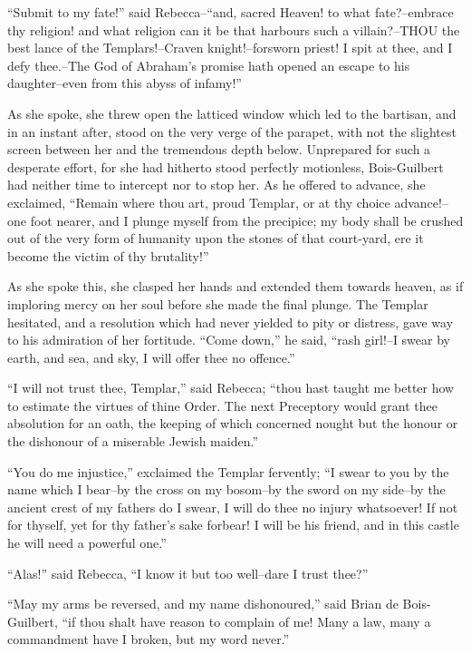 ``Submit to my fate!'' said Rebecca--``and, sacred Heaven! to what
fate?--embrace thy religion! and what religion can it be that harbours
such a villain?--THOU the best lance of the Templars!--Craven
knight!--forsworn priest! I spit at thee, and I defy thee.--The God of
Abraham's promise hath opened an escape to his daughter--even from this
abyss of infamy!''

As she spoke, she threw open the latticed window which led to the
bartisan, and in an instant after, stood on the very verge of the
parapet, with not the slightest screen between her and the tremendous
depth below. Unprepared for such a desperate effort, for she had
hitherto stood perfectly motionless, Bois-Guilbert had neither time to
intercept nor to stop her. As he offered to advance, she exclaimed,
``Remain where thou art, proud Templar, or at thy choice advance!--one
foot nearer, and I plunge myself from the precipice; my body shall be
crushed out of the very form of humanity upon the stones of that
court-yard, ere it become the victim of thy brutality!''

As she spoke this, she clasped her hands and extended them towards
heaven, as if imploring mercy on her soul before she made the final
plunge. The Templar hesitated, and a resolution which had never yielded
to pity or distress, gave way to his admiration of her fortitude. ``Come
down,'' he said, ``rash girl!--I swear by earth, and sea, and sky, I
will offer thee no offence.''

``I will not trust thee, Templar,'' said Rebecca; ``thou hast taught me
better how to estimate the virtues of thine Order. The next Preceptory
would grant thee absolution for an oath, the keeping of which concerned
nought but the honour or the dishonour of a miserable Jewish maiden.''

``You do me injustice,'' exclaimed the Templar fervently; ``I swear to
you by the name which I bear--by the cross on my bosom--by the sword on
my side--by the ancient crest of my fathers do I swear, I will do thee
no injury whatsoever! If not for thyself, yet for thy father's sake
forbear! I will be his friend, and in this castle he will need a
powerful one.''

``Alas!'' said Rebecca, ``I know it but too well--dare I trust thee?''

``May my arms be reversed, and my name dishonoured,'' said Brian de
Bois-Guilbert, ``if thou shalt have reason to complain of me! Many a
law, many a commandment have I broken, but my word never.''

